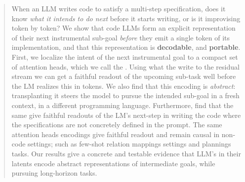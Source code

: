 \begin{abstract}

When an LLM writes code to satisfy a multi-step specification, does it know \emph{what it intends to do next} before it starts writing, or is it improvising token by token? We show that code LLMs form an explicit representation of their next instrumental sub-goal \emph{before} they emit a single token of its implementation, and that this representation is \textbf{decodable}, and \textbf{portable}. First, we localize the intent of the next instrumental goal to a compact set of attention heads, which we call the \goalheads. Using what the \goalheads write to the residual stream we can get a faithful readout of the upcoming sub-task well before the LM realizes this in tokens. We also find that this encoding is \emph{abstract}: transplanting it steers the model to pursue the intended sub-goal in a fresh context, in a different programming language. Furthermore, find that the same \goalheads give faithful readouts of the LM's next-step in writing the code where the specifications are not concretely defined in the prompt. The same attention heads encodings give faithful readout and remain causal in non-code settings; such as few-shot relation mappings settings and plannings tasks. Our results give a concrete and testable evidence that LLM's in their latents encode abstract representations of intermediate goals, while pursuing long-horizon tasks.

\end{abstract}
